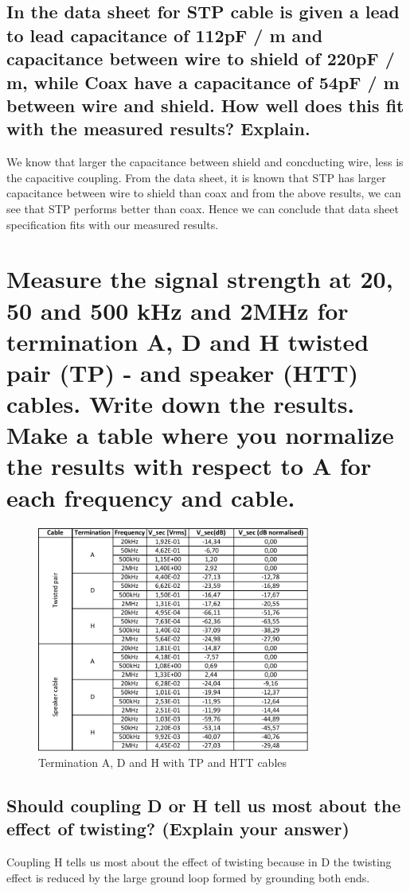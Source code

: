 \documentclass[12pt,a4paper,UKenglish]{article}
\begin{document}
\subsection{In the data sheet for STP cable is given a lead to lead capacitance of 112pF / m and capacitance between wire to shield of 220pF / m, while Coax have a capacitance of 54pF / m between wire and shield. How well does this fit with the measured results? Explain.}
We know that larger the capacitance between shield and concducting wire, less is the capacitive coupling. From the data sheet, it is known that STP has larger capacitance between wire to shield than coax and from the above results, we can see that STP performs better than coax. Hence we can conclude that data sheet specification fits with our measured results. 

\section{Measure the signal strength at 20, 50 and 500 kHz and 2MHz for termination A, D and H twisted pair (TP) - and speaker (HTT) cables. Write down the results. Make a table where you normalize the results with respect to A for each frequency and cable.}
\begin{figure} [H] %
  \centering 
  \includegraphics[width=0.8\textwidth]{img/task10_data.pdf} 
  \caption{Termination A, D and H with TP and HTT cables}
  \label{fig:task10} 
\end{figure}
\subsection{Should coupling D or H tell us most about the effect of twisting? (Explain your answer)}
Coupling H tells us most about the effect of twisting because in D the twisting effect is reduced by the large ground loop formed by grounding both ends.
\end{document}
